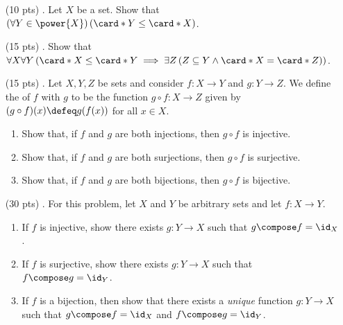 \begin{enumerate}
  \item[(10 pts) \quad 1.]
    Let $X$ be a set.
    Show that $\left(\forall Y \in \power{X}\right)\left(\card*{Y} \leq \card*{X}\right)$.

  \item[(15 pts) \quad 2.]
    Show that $\forall X \forall Y \left(\card*{X} \leq  \card*{Y} \implies \exists Z \left(Z \subseteq Y \land \card*{X} = \card*{Z}\right)\right)$.

  \item[(15 pts) \quad 3.]
    Let $X, Y, Z$ be sets and consider
    $f: X \to Y$ and $g: Y \to Z$.%
    We define the  of $f$ with $g$ to be the function
    $g \circ f: X \to Z$ given by
    $(g \circ f)(x) \defeq g(f(x))$
    for all $x \in X$.
    \begin{enumerate}
      \item
        Show that, if $f$ and $g$ are both injections,
        then $g \circ f$ is injective.
      \item
        Show that, if $f$ and $g$ are both surjections,
        then $g \circ f$ is surjective.
      \item
        Show that, if $f$ and $g$ are both bijections,
        then $g \circ f$ is bijective.
    \end{enumerate}

  \item[(30 pts) \quad 4.]
    For this problem, let $X$ and $Y$ be arbitrary sets and let $f: X \to Y$.
    \begin{enumerate}
      \item
        If $f$ is injective, show there exists $g: Y \to X$ such that $g \compose f = \id_X$.
      \item
        If $f$ is surjective, show there exists $g: Y \to X$ such that $f \compose g = \id_Y$.
      \item
        If $f$ is a bijection, then show that there exists a \emph{unique} function $g: Y \to X$ such that $g \compose f = \id_X$ and $f \compose g = \id_Y$.
    \end{enumerate}


\end{enumerate}
